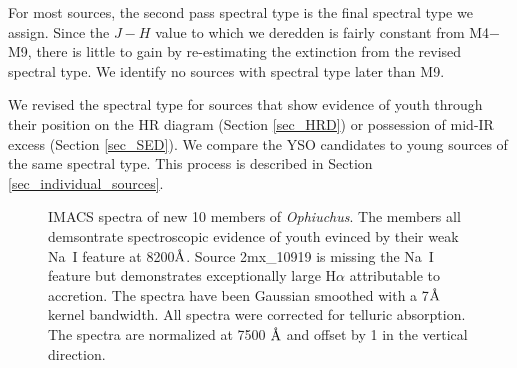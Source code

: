 \documentclass[12pt,preprint]{aastex}
\newcommand{\angstrom}{\mbox{\normalfont\AA}}
\begin{document}
For most sources, the second pass spectral type is the final spectral type we assign.  Since the $J-H$ value to which we deredden is fairly constant from M4$-$M9, there is little to gain by re-estimating the extinction from the revised spectral type.  We identify no sources with spectral type later than M9.  

We revised the spectral type for sources that show evidence of youth through their position on the HR diagram (Section \ref{sec_HRD}) or possession of mid-IR excess (Section \ref{sec_SED}).  We compare the YSO candidates to young sources of the same spectral type.  This process is described in Section \ref{sec_individual_sources}.


\begin{figure}[ht!]
\caption{IMACS spectra of new 10 members of \emph{Ophiuchus}.  The members all demsontrate spectroscopic evidence of youth evinced by their weak Na~I feature at 8200$\angstrom$.  Source 2mx\_10919 is missing the Na~I feature but demonstrates exceptionally large H$\alpha$ attributable to accretion.  The spectra have been Gaussian smoothed with a 7$\angstrom$ kernel bandwidth.  All spectra were corrected for telluric absorption.  The spectra are normalized at 7500 $\angstrom$ and offset by 1 in the vertical direction. \label{fig_IMACS_spectra1} }
\centering

\end{figure}
\end{document}
